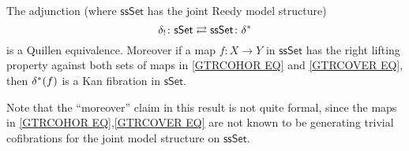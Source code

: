 \documentclass[a4paper,10pt
 ,draft
]{article}%
\begin{document}
\begin{corollary}\label{SSETSSETADJ COR}
	The adjunction (where $\mathsf{ssSet}$ has the joint Reedy model structure)
\[
	\delta_{!}\colon \mathsf{sSet} 
		\rightleftarrows 
	\mathsf{ssSet} \colon \delta^{\**}
\]
is a Quillen equivalence.
Moreover if a map $f\colon X \to Y$ in $\mathsf{ssSet}$ has the right lifting property
against both sets of maps in
\eqref{GTRCOHOR EQ} and \eqref{GTRCOVER EQ}, then
$\delta^{\**} (f)$ is a Kan fibration in $\mathsf{sSet}$.
\end{corollary}

Note that the ``moreover'' claim in this result is not quite formal, since the maps in \eqref{GTRCOHOR EQ},\eqref{GTRCOVER EQ} are not known to be generating trivial cofibrations for the joint model structure on $\mathsf{ssSet}$.
\end{document}
